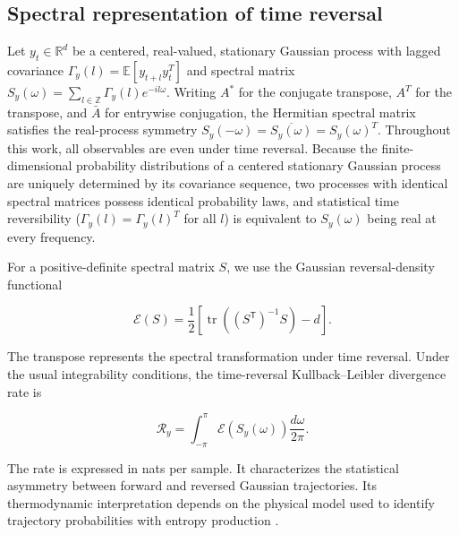 \documentclass[aps,pre,reprint,amsmath,amssymb,superscriptaddress]{revtex4-2}
\begin{document}
\subsection{Spectral representation of time reversal}

Let $y_t \in \mathbb{R}^d$ be a centered, real-valued, stationary Gaussian process with lagged covariance $\Gamma_y(l) = \mathbb{E}[y_{t+l}y_t^T]$ and spectral matrix $S_y(\omega) = \sum_{l\in\mathbb{Z}} \Gamma_y(l) e^{-il\omega}$. Writing $A^*$ for the conjugate transpose, $A^T$ for the transpose, and $\bar{A}$ for entrywise conjugation, the Hermitian spectral matrix satisfies the real-process symmetry $S_y(-\omega) = \overline{S_y(\omega)} = S_y(\omega)^T$. Throughout this work, all observables are even under time reversal. Because the finite-dimensional probability distributions of a centered stationary Gaussian process are uniquely determined by its covariance sequence, two processes with identical spectral matrices possess identical probability laws, and statistical time reversibility ($\Gamma_y(l) = \Gamma_y(l)^T$ for all $l$) is equivalent to $S_y(\omega)$ being real at every frequency.

For a positive-definite spectral matrix \(S\), we use the Gaussian reversal-density functional

\begin{equation}\label{eq:1}
\boxed{
\mathcal E(S)
=
\frac12
\left[
\operatorname{tr}\left((S^{\mathsf T})^{-1}S\right)-d
\right].
}
\end{equation}

The transpose represents the spectral transformation under time reversal. Under the usual integrability conditions, the time-reversal Kullback--Leibler divergence rate is

\begin{equation}\label{eq:2}
\boxed{
\mathcal R_y
=
\int_{-\pi}^{\pi}
\mathcal E(S_y(\omega))
\frac{d\omega}{2\pi}.
}
\end{equation}

The rate is expressed in nats per sample. It characterizes the statistical asymmetry between forward and reversed Gaussian trajectories. Its thermodynamic interpretation depends on the physical model used to identify trajectory probabilities with entropy production \cite{seara2021}.
\end{document}
